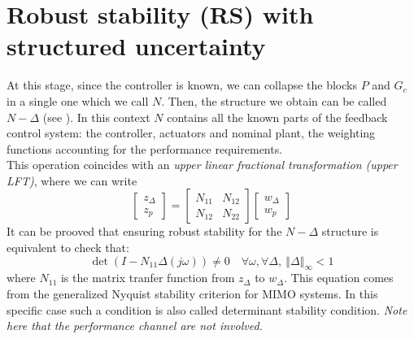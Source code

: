 \documentclass[a4paper, 12pt]{article}
\begin{document}
\section{Robust stability (RS) with structured uncertainty}
At this stage, since the controller is known, we can collapse the blocks $P$ and $G_c$ in a single one which we call $N$. Then, the structure we obtain can be called $N-\Delta$ (see ). In this context $N$ contains all the known parts of the feedback control system: the controller, actuators and nominal plant, the weighting functions accounting for the performance requirements.\\
This operation coincides with an \textit{upper linear fractional transformation (upper LFT)}, where we can write
\begin{equation}
    \begin{bmatrix}
        z_\Delta\\
        z_p
    \end{bmatrix}=\begin{bmatrix}
        N_{11}&N_{12}\\
        N_{12}&N_{22}
    \end{bmatrix}
    \begin{bmatrix}
        w_\Delta\\
        w_p
    \end{bmatrix}
\end{equation}
It can be prooved that ensuring robust stability for the $N-\Delta$ structure is equivalent to check that: 
\begin{equation}\label{eq:RS_cond}
    \det(I-N_{11}\Delta(j\omega))\ne0 \quad \forall \omega, \forall \Delta, \ \Vert \Delta \Vert_\infty<1
\end{equation}
where $N_{11}$ is the matrix tranfer function from $z_\Delta$ to $w_\Delta$. This equation comes from the generalized Nyquist stability criterion for MIMO systems. In this specific case such a condition is also called \textsf{determinant stability condition}. \emph{Note here that the performance channel are not involved.}
\end{document}
